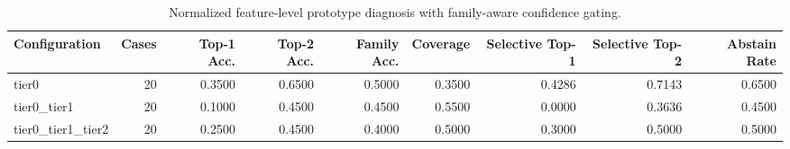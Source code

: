 \begin{table}[t]
\centering
\caption{Normalized feature-level prototype diagnosis with family-aware confidence gating.}
\label{tab:dice_stressor_hierarchical_diagnosis}
\footnotesize
\begin{tabular}{lrrrrrrrr}
\toprule
Configuration & Cases & Top-1 Acc. & Top-2 Acc. & Family Acc. & Coverage & Selective Top-1 & Selective Top-2 & Abstain Rate \\
\midrule
tier0 & 20 & 0.3500 & 0.6500 & 0.5000 & 0.3500 & 0.4286 & 0.7143 & 0.6500 \\
tier0_tier1 & 20 & 0.1000 & 0.4500 & 0.4500 & 0.5500 & 0.0000 & 0.3636 & 0.4500 \\
tier0_tier1_tier2 & 20 & 0.2500 & 0.4500 & 0.4000 & 0.5000 & 0.3000 & 0.5000 & 0.5000 \\
\bottomrule
\end{tabular}

\end{table}
